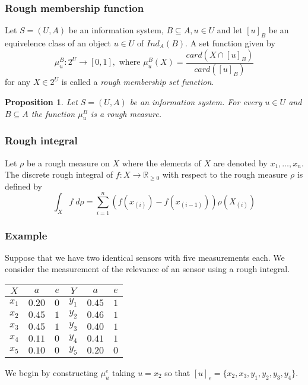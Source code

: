\documentclass[envcountsect]{beamer}
\newtheorem{proposition}[theorem]{Proposition}
\begin{document}
\begin{frame}
\frametitle{Rough membership function}

\begin{definition}
	Let $S=(U,A)$ be an information system, $B \subseteq A, u \in U$ and let $[u]_B$ be an equivelence class of an object $u \in U$ of $Ind_A(B)$. A set function given by 
	$$
	\mu_u^B : 2^U \rightarrow [0,1], \text{ where } \mu_u^B (X) = \frac{card(X \cap [u]_B)}{card([u]_B)}
	$$
for any $X \in 2^U$ is called a \emph{rough membership set function}.
\end{definition}

\begin{proposition}
Let $S=(U,A)$ be an information system. For every $u \in U$ and $B \subseteq A$ the function $\mu_u^B$ is a rough measure.

\end{proposition}
\end{frame}

\begin{frame}
\frametitle{Rough integral}

\begin{definition}
	Let $\rho$ be a rough measure on $X$ where the elements of $X$ are denoted by $x_1,\dots,x_n$. The discrete rough integral of $f : X \rightarrow \mathbb{R}_{\geq 0}$ with respect to the rough measure $\rho$ is defined by
	$$
	\int_X f \; d\rho = \sum_{i=1}^n (f(x_{(i)})- f(x_{(i-1)}))\rho(X_{(i)})
	$$

\end{definition}

\end{frame}

\begin{frame}
	\frametitle{Example}
Suppose that we have two identical sensors with five measurements each. We consider the measurement of the relevance of an sensor using a rough integral. 

\begin{table}
	\begin{tabular}{cccccc}
		\hline 
		$X$& $a$& $e$& $Y$ & $a$& $e$\\
		\hline
		$x_1$ & $0.20$ & $0$&  $y_1$ & $0.45$ & $1$ \\
		$x_2$ & $0.45$ & $1$ & $y_2$ & $0.46$ & $1$ \\
		$x_3$ & $0.45$ & $1$ & $y_3$ & $0.40$ & $1$  \\
		$x_4$ & $0.11$ & $0$ & $y_4$ & $0.41$ & $1$ \\
		$x_5$ & $0.10$ & $0$ & $y_5$ & $0.20$ & $0$\\
		\hline
	\end{tabular}
\end{table}
	We begin by constructing $\mu_u^e$ taking $u=x_2$ so that $[u]_e = \{x_2,x_3,y_1,y_2,y_3,y_4\}.$
\end{frame}
\end{document}
